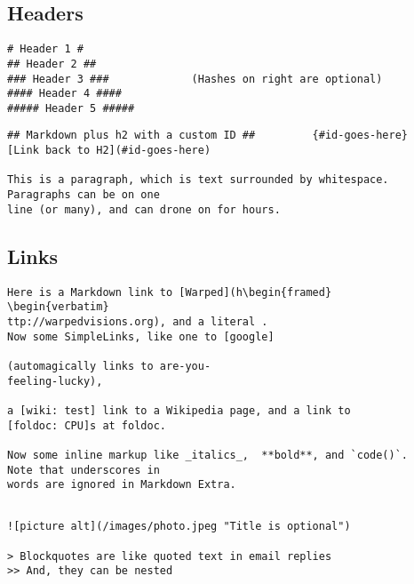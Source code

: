 \documentclass[]{article}
\begin{document}
	\subsection*{Headers}
\begin{framed}
\begin{verbatim}
# Header 1 #
## Header 2 ##
### Header 3 ###             (Hashes on right are optional)
#### Header 4 ####
##### Header 5 #####
\end{verbatim}
\end{framed}

\begin{framed}
\begin{verbatim}
## Markdown plus h2 with a custom ID ##         {#id-goes-here}
[Link back to H2](#id-goes-here)

This is a paragraph, which is text surrounded by whitespace. 
Paragraphs can be on one 
line (or many), and can drone on for hours.  
\end{verbatim}
\end{framed}

\subsection*{Links}
\begin{framed}
	\begin{verbatim}
Here is a Markdown link to [Warped](h\begin{framed}
\begin{verbatim}
ttp://warpedvisions.org), and a literal . 
Now some SimpleLinks, like one to [google] 

(automagically links to are-you-
feeling-lucky), 

a [wiki: test] link to a Wikipedia page, and a link to 
[foldoc: CPU]s at foldoc.  

Now some inline markup like _italics_,  **bold**, and `code()`. 
Note that underscores in 
words are ignored in Markdown Extra.
\end{verbatim}
\end{framed}
\newpage
\begin{framed}
	\begin{verbatim}
	
![picture alt](/images/photo.jpeg "Title is optional")     

> Blockquotes are like quoted text in email replies
>> And, they can be nested

\end{verbatim}
\end{framed}
\end{document}
